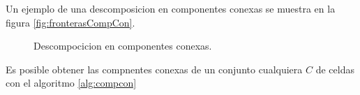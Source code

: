 Un ejemplo de una descomposicion en componentes conexas se muestra en la figura \ref{fig:fronterasCompCon}.

\begin{figure}[H]
  \centering
  \qquad

  \caption{Descompocicion en componentes conexas.}\label{fig:descCompCon}
\end{figure}

Es posible obtener las compnentes conexas de un conjunto cualquiera $C$ de
celdas con el algoritmo \ref{alg:compcon}

